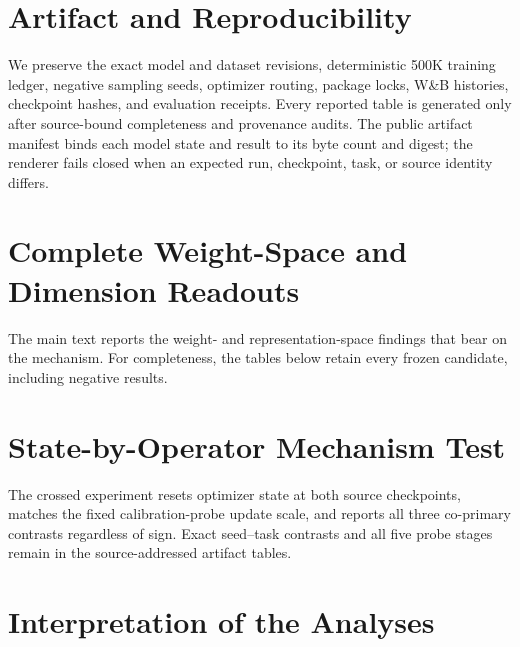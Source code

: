 \documentclass[11pt]{article}
\begin{document}


\appendix

\section{Artifact and Reproducibility}

We preserve the exact model and dataset revisions, deterministic 500K training ledger, negative
sampling seeds, optimizer routing, package locks, W\&B histories, checkpoint hashes, and evaluation
receipts. Every reported table is generated only after source-bound completeness and provenance
audits. The public artifact manifest binds each model state and result to its byte count and digest;
the renderer fails closed when an expected run, checkpoint, task, or source identity differs.

\section{Complete Weight-Space and Dimension Readouts}

The main text reports the weight- and representation-space findings that bear on the mechanism.
For completeness, the tables below retain every frozen candidate, including negative results.

\CorrectedGeometryBridgeTable

\DimensionUtilizationAppendixTable

\section{State-by-Operator Mechanism Test}

The crossed experiment resets optimizer state at both source checkpoints, matches the fixed
calibration-probe update scale, and reports all three co-primary contrasts regardless of sign.
Exact seed--task contrasts and all five probe stages remain in the source-addressed artifact tables.

\StateOperatorAppendixTable

\FloatBarrier

\section{Interpretation of the Analyses}
\end{document}
